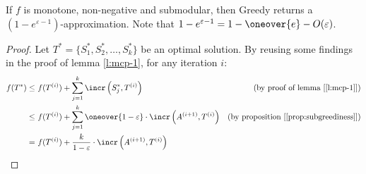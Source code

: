 \begin{theorem}\label{thm:sub-greedy}
    If $f$ is monotone, non-negative and submodular, then Greedy returns a $(1 - e^{\varepsilon - 1})$-approximation. Note that $1 - e^{\varepsilon - 1} = 1 - \oneover{e} - O(\varepsilon)$.
\end{theorem}

\begin{proof}
    Let $T^* = \{S_1^*, S_2^*, \ldots, S_k^*\}$ be an optimal solution. By reusing some findings in the proof of lemma \ref{l:mcp-1}, for any iteration $i$:
    \begin{align*}
                   f(T^*) 
            \leq&\ f(T^{(i)}) + \sum_{j = 1}^k \incr \left( S^*_j, T^{(i)} \right)                                          & \text{(by proof of lemma [\ref{l:mcp-1}])} \\
            \leq&\ f(T^{(i)}) + \sum_{j = 1}^k \oneover{1 - \varepsilon} \cdot \incr \left( A^{(i + 1)}, T^{(i)} \right)    & \text{(by proposition [\ref{prop:subgreediness}])} \\
               =&\ f(T^{(i)}) + \frac{k}{1 - \varepsilon} \cdot \incr \left( A^{(i + 1)}, T^{(i)} \right)                   &
    \end{align*}

\end{proof}